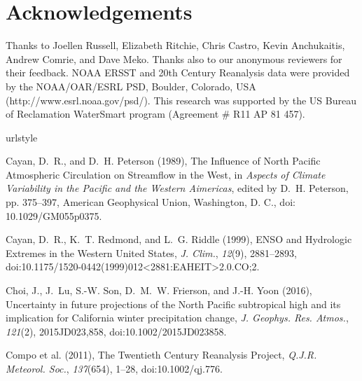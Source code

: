 \documentclass[final, double]{ua-thesis}
\begin{document}
\section{Acknowledgements}

Thanks to Joellen Russell, Elizabeth Ritchie, Chris Castro, Kevin Anchukaitis, Andrew Comrie, and Dave Meko. Thanks also to our anonymous reviewers for their feedback. NOAA ERSST and 20th Century Reanalysis data were provided by the NOAA/OAR/ESRL PSD, Boulder, Colorado, USA (http://www.esrl.noaa.gov/psd/). This research was supported by the US Bureau of Reclamation WaterSmart program (Agreement \# R11 AP 81 457). 

% 
% 

\begin{thebibliography}{59}
\providecommand{\natexlab}[1]{#1}
\expandafter\ifx\csname urlstyle\endcsname\relax
  \providecommand{\doi}[1]{doi:\discretionary{}{}{}#1}\else
  \providecommand{\doi}{doi:\discretionary{}{}{}\begingroup
  \urlstyle{rm}\Url}\fi

Cayan, D.~R., and D.~H. Peterson (1989), The {Influence} of {North} {Pacific}
  {Atmospheric} {Circulation} on {Streamflow} in the {West}, in \textit{Aspects
  of {Climate} {Variability} in the {Pacific} and the {Western} {Aimericas}},
  edited by D.~H. Peterson, pp. 375--397, American Geophysical Union,
  Washington, D. C., doi: 10.1029/GM055p0375.

Cayan, D.~R., K.~T. Redmond, and L.~G. Riddle (1999), {ENSO} and {Hydrologic}
  {Extremes} in the {Western} {United} {States}, \textit{J. Clim.},
  \textit{12}(9), 2881--2893,
  \doi{10.1175/1520-0442(1999)012<2881:EAHEIT>2.0.CO;2}.

Choi, J., J.~Lu, S.-W. Son, D.~M.~W. Frierson, and J.-H. Yoon (2016),
  Uncertainty in future projections of the {North} {Pacific} subtropical high
  and its implication for {California} winter precipitation change, \textit{J.
  Geophys. Res. Atmos.}, \textit{121}(2), 2015JD023,858,
  \doi{10.1002/2015JD023858}.

Compo et al. (2011), The {Twentieth} {Century} {Reanalysis} {Project},
  \textit{Q.J.R. Meteorol. Soc.}, \textit{137}(654), 1--28,
  \doi{10.1002/qj.776}.


\end{thebibliography}
\end{document}
